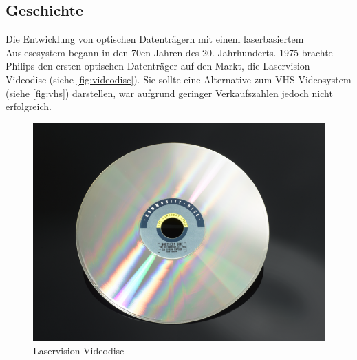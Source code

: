 \subsection{Geschichte}
\label{subsec:cdgeschichte}

Die Entwicklung von optischen Datenträgern mit einem laserbasiertem
Auslesesystem begann in den 70en Jahren des 20. Jahrhunderts. 1975 brachte
Philips den ersten optischen Datenträger auf den Markt, die Laservision
Videodisc (siehe \autoref{fig:videodisc}). Sie sollte eine Alternative zum
VHS-Videosystem (siehe \autoref{fig:vhs}) darstellen, war aufgrund geringer
Verkaufszahlen jedoch nicht erfolgreich.

\begin{figure}[h]
    \begin{center}
        \begin{minipage}[t]{0.3\textwidth}
            \begin{center}
                \includegraphics[height=0.1\textheight]{Bilder/Optische_Datentraeger_Die_Compact_Disc/Geschichte/videodisc.png}
                \caption[Laservision Videodisc \newline \url{http://www.sciencemuseum.org.uk/online_science/explore_our_collections/objects/index/smxg-8095649}]{Laservision Videodisc}
                \label{fig:videodisc}
            \end{center}
        \end{minipage}
        \hspace{0.025\textwidth}
        \begin{minipage}[t]{0.3\textwidth}
            \begin{center}

\end{center}
\end{minipage}
\end{center}
\end{figure}
